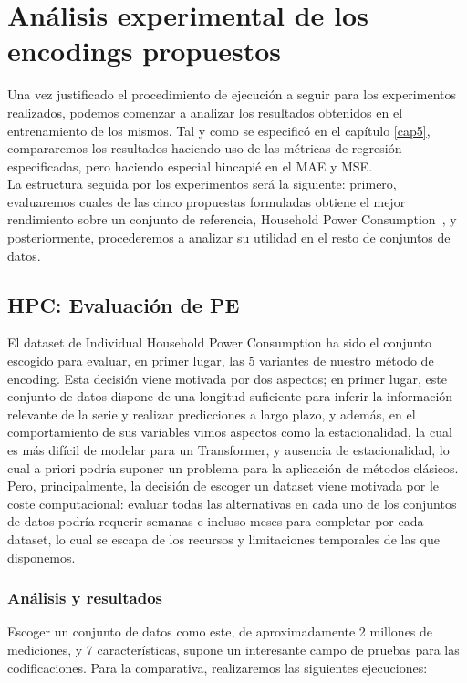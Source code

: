 \section{Análisis experimental de los encodings propuestos}

Una vez justificado el procedimiento de ejecución a seguir para los experimentos realizados, podemos comenzar a analizar los resultados obtenidos en el entrenamiento de los mismos. Tal y como se especificó en el capítulo \ref{cap5}, compararemos los resultados haciendo uso de las métricas de regresión especificadas, pero haciendo especial hincapié en el MAE y MSE.\\

La estructura seguida por los experimentos será la siguiente: primero, evaluaremos cuales de las cinco propuestas formuladas obtiene el mejor rendimiento sobre un conjunto de referencia, Household Power Consumption~\cite{hebrail2006individual}, y posteriormente, procederemos a analizar su utilidad en el resto de conjuntos de datos.

\subsection{HPC: Evaluación de PE}

El dataset de Individual Household Power Consumption ha sido el conjunto escogido para evaluar, en primer lugar, las 5 variantes de nuestro método de encoding. Esta decisión viene motivada por dos aspectos; en primer lugar, este conjunto de datos dispone de una longitud suficiente para inferir la información relevante de la serie y realizar predicciones a largo plazo, y además, en el comportamiento de sus variables vimos aspectos como la estacionalidad, la cual es más difícil de modelar para un Transformer, y ausencia de estacionalidad, lo cual a priori podría suponer un problema para la aplicación de métodos clásicos. Pero, principalmente, la decisión de escoger un dataset viene motivada por le coste computacional: evaluar todas las alternativas en cada uno de los conjuntos de datos podría requerir semanas e incluso meses para completar por cada dataset, lo cual se escapa de los recursos y limitaciones temporales de las que disponemos.

\subsubsection{Análisis y resultados}

Escoger un conjunto de datos como este, de aproximadamente 2 millones de mediciones, y 7 características, supone un interesante campo de pruebas para las codificaciones. Para la comparativa, realizaremos las siguientes ejecuciones:

